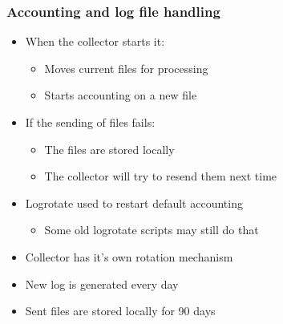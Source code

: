 \documentclass{beamer}
\begin{document}
\begin{frame}[t, fragile]
\frametitle{Accounting and log file handling}
\begin{itemize}
 \item When the collector starts it:
\begin{itemize}
	\item Moves current files for processing
	\item Starts accounting on a new file
\end{itemize}
 \item If the sending of files fails:
\begin{itemize}
	\item The files are stored locally
	\item The collector will try to resend them next time
\end{itemize}
 \item Logrotate used to restart default accounting
\begin{itemize}
	\item Some old logrotate scripts may still do that
\end{itemize}
\item Collector has it's own rotation mechanism
\item New log is generated every day
\item Sent files are stored locally for 90 days
\end{itemize}
\end{frame}
\end{document}
